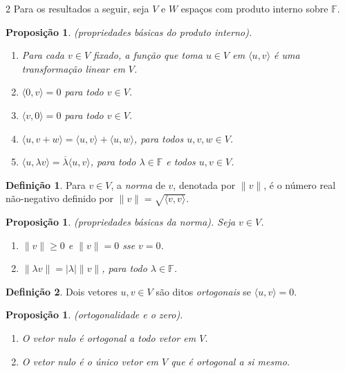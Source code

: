 \documentclass{article}
\theoremstyle{plain}
\newtheorem{prop}[thm]{Proposição}
\theoremstyle{definition}
\newtheorem{defn}{Definição}[section]
\theoremstyle{remark}
\begin{document}
\begin{multicols}{2}
Para os resultados a seguir, seja \(V\) e \(W\) espaços com produto interno sobre \(\mathbb{F}\).

\begin{prop} (propriedades básicas do produto interno).
    \begin{enumerate}
        \item [\textup{(a)}] Para cada \(v \in V\) fixado, a função que toma \(u \in V\) em \(\langle u, v \rangle\) é uma transformação linear em \(V\).
        \item [\textup{(b)}] \(\langle 0, v \rangle = 0\) para todo \(v \in V\).
        \item [\textup{(c)}] \(\langle v, 0 \rangle = 0\) para todo \(v \in V\).
        \item [\textup{(d)}] \(\langle u, v + w \rangle = \langle u, v \rangle + \langle u, w \rangle\), para todos \(u, v, w \in V\).
        \item [\textup{(e)}] \(\langle u, \lambda v \rangle = \overline{\lambda} \langle u, v \rangle\), para todo \(\lambda \in \mathbb{F}\) e todos \(u, v \in V\).
    \end{enumerate}
\end{prop}

\begin{defn}
    Para \(v \in V\), a \emph{norma} de \(v\), denotada por \(\|v\|\), é o número real não-negativo definido por \(\|v\| = \sqrt{\langle v, v \rangle}\).
\end{defn}

\begin{prop} (propriedades básicas da norma).
    Seja \(v \in V\).
    \begin{enumerate}
        \item [\textup{(a)}] \(\|v\| \geq 0\) e \(\|v\| = 0\) sse \(v = 0\).
        \item [\textup{(b)}] \(\|\lambda v\| = |\lambda| \|v\|\), para todo \(\lambda \in \mathbb{F}\).
    \end{enumerate}
\end{prop}

\begin{defn}
    Dois vetores \(u, v \in V\) são ditos \emph{ortogonais} se \(\langle u, v \rangle = 0\).
\end{defn}

\begin{prop} (ortogonalidade e o zero).
    \begin{enumerate}
        \item [\textup{(a)}] O vetor nulo é ortogonal a todo vetor em \(V\).
        \item [\textup{(b)}] O vetor nulo é o único vetor em \(V\) que é ortogonal a si mesmo.
    \end{enumerate}
\end{prop}


\end{multicols}
\end{document}
